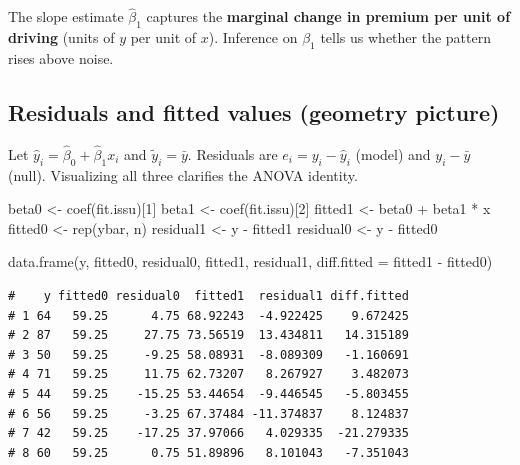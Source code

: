 \documentclass[
  letterpaper,
  DIV=11,
  numbers=noendperiod]{scrreprt}
\newenvironment{Shaded}{\begin{snugshade}}{\end{snugshade}}
\newcommand{\AttributeTok}[1]{\textcolor[rgb]{0.40,0.45,0.13}{#1}}
\newcommand{\DecValTok}[1]{\textcolor[rgb]{0.68,0.00,0.00}{#1}}
\newcommand{\FunctionTok}[1]{\textcolor[rgb]{0.28,0.35,0.67}{#1}}
\newcommand{\NormalTok}[1]{\textcolor[rgb]{0.00,0.23,0.31}{#1}}
\newcommand{\OtherTok}[1]{\textcolor[rgb]{0.00,0.23,0.31}{#1}}
\newcommand{\SpecialCharTok}[1]{\textcolor[rgb]{0.37,0.37,0.37}{#1}}
\begin{document}
The slope estimate \(\hat\beta_1\) captures the \textbf{marginal change
in premium per unit of driving} (units of \(y\) per unit of \(x\)).
Inference on \(\beta_1\) tells us whether the pattern rises above noise.

\subsection{Residuals and fitted values (geometry
picture)}\label{residuals-and-fitted-values-geometry-picture}

Let \(\hat y_i=\hat\beta_0+\hat\beta_1 x_i\) and \(\tilde y_i=\bar y\).
Residuals are \(e_i=y_i-\hat y_i\) (model) and \(y_i-\bar y\) (null).
Visualizing all three clarifies the ANOVA identity.

\begin{Shaded}
\begin{Highlighting}[]
\NormalTok{beta0 }\OtherTok{\textless{}{-}} \FunctionTok{coef}\NormalTok{(fit.issu)[}\DecValTok{1}\NormalTok{]}
\NormalTok{beta1 }\OtherTok{\textless{}{-}} \FunctionTok{coef}\NormalTok{(fit.issu)[}\DecValTok{2}\NormalTok{]}
\NormalTok{fitted1 }\OtherTok{\textless{}{-}}\NormalTok{ beta0 }\SpecialCharTok{+}\NormalTok{ beta1 }\SpecialCharTok{*}\NormalTok{ x}
\NormalTok{fitted0 }\OtherTok{\textless{}{-}} \FunctionTok{rep}\NormalTok{(ybar, n)}
\NormalTok{residual1 }\OtherTok{\textless{}{-}}\NormalTok{ y }\SpecialCharTok{{-}}\NormalTok{ fitted1}
\NormalTok{residual0 }\OtherTok{\textless{}{-}}\NormalTok{ y }\SpecialCharTok{{-}}\NormalTok{ fitted0}

\FunctionTok{data.frame}\NormalTok{(y, fitted0, residual0, fitted1, residual1,}
           \AttributeTok{diff.fitted =}\NormalTok{ fitted1 }\SpecialCharTok{{-}}\NormalTok{ fitted0)}
\end{Highlighting}
\end{Shaded}

\begin{verbatim}
#    y fitted0 residual0  fitted1  residual1 diff.fitted
# 1 64   59.25      4.75 68.92243  -4.922425    9.672425
# 2 87   59.25     27.75 73.56519  13.434811   14.315189
# 3 50   59.25     -9.25 58.08931  -8.089309   -1.160691
# 4 71   59.25     11.75 62.73207   8.267927    3.482073
# 5 44   59.25    -15.25 53.44654  -9.446545   -5.803455
# 6 56   59.25     -3.25 67.37484 -11.374837    8.124837
# 7 42   59.25    -17.25 37.97066   4.029335  -21.279335
# 8 60   59.25      0.75 51.89896   8.101043   -7.351043
\end{verbatim}
\end{document}
